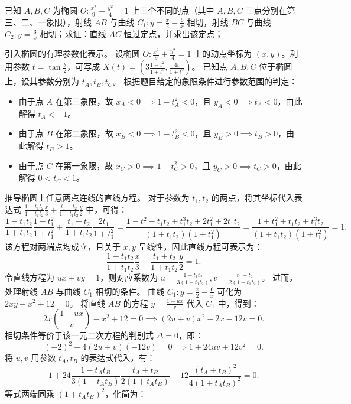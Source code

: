 \begin{example}
已知 \(A,B,C\) 为椭圆 \(O: \frac{x^2}{9} + \frac{y^2}{4} = 1\) 上三个不同的点（其中 \(A,B,C\) 三点分别在第三、二、一象限），射线 \(AB\) 与曲线 \(C_1: y = \frac{x}{2} - \frac{6}{x}\) 相切，射线 \(BC\) 与曲线 \(C_2: y = \frac{3}{x}\) 相切；求证：直线 \(AC\) 恒过定点，并求出该定点；
\end{example}
\begin{solution}
引入椭圆的有理参数化表示。
设椭圆 $O: \frac{x^2}{9} + \frac{y^2}{4} = 1$ 上的动点坐标为 $(x, y)$。利用参数 $t = \tan\frac{\theta}{2}$，可写成 $X(t) = \left( 3\frac{1-t^2}{1+t^2}, \frac{4t}{1+t^2} \right)$。
已知点 $A, B, C$ 位于椭圆上，设其参数分别为 $t_A, t_B, t_C$。
根据题目给定的象限条件进行参数范围的判定：
\begin{itemize}
\item 由于点 $A$ 在第三象限，故 $x_A < 0 \implies 1-t_A^2 < 0$，且 $y_A < 0 \implies t_A < 0$，由此解得 $t_A < -1$。
\item 由于点 $B$ 在第二象限，故 $x_B < 0 \implies 1-t_B^2 < 0$，且 $y_B > 0 \implies t_B > 0$，由此解得 $t_B > 1$。
\item 由于点 $C$ 在第一象限，故 $x_C > 0 \implies 1-t_C^2 > 0$，且 $y_C > 0 \implies t_C > 0$，由此解得 $0 < t_C < 1$。
\end{itemize}
推导椭圆上任意两点连线的直线方程。
对于参数为 $t_1, t_2$ 的两点，将其坐标代入表达式 $\frac{1-t_1t_2}{1+t_1t_2}\frac{x}{3} + \frac{t_1+t_2}{1+t_1t_2}\frac{y}{2}$ 中，可得：
\[
\frac{1-t_1t_2}{1+t_1t_2} \frac{1-t_1^2}{1+t_1^2} + \frac{t_1+t_2}{1+t_1t_2} \frac{2t_1}{1+t_1^2} = \frac{1 - t_1^2 - t_1t_2 + t_1^3 t_2 + 2t_1^2 + 2t_1t_2}{(1+t_1t_2)(1+t_1^2)} = \frac{1 + t_1^2 + t_1t_2 + t_1^3t_2}{(1+t_1t_2)(1+t_1^2)} = 1.
\]
该方程对两端点均成立，且关于 $x, y$ 呈线性，因此直线方程可表示为：
\[
\frac{1-t_1t_2}{1+t_1t_2}\frac{x}{3} + \frac{t_1+t_2}{1+t_1t_2}\frac{y}{2} = 1.
\]
令直线方程为 $ux + vy = 1$，则对应系数为 $u = \frac{1-t_1t_2}{3(1+t_1t_2)}, v = \frac{t_1+t_2}{2(1+t_1t_2)}$。
进而，处理射线 $AB$ 与曲线 $C_1$ 相切的条件。
曲线 $C_1: y = \frac{x}{2} - \frac{6}{x}$ 可化为 $2xy - x^2 + 12 = 0$。
将直线 $AB$ 的方程 $y = \frac{1-ux}{v}$ 代入 $C_1$ 中，得到：
\[
2x\left(\frac{1-ux}{v}\right) - x^2 + 12 = 0 \implies (2u+v)x^2 - 2x - 12v = 0.
\]
相切条件等价于该一元二次方程的判别式 $\Delta = 0$，即：
\[
(-2)^2 - 4(2u+v)(-12v) = 0 \implies 1 + 24uv + 12v^2 = 0.
\]
将 $u, v$ 用参数 $t_A, t_B$ 的表达式代入，有：
\[
1 + 24 \frac{1-t_At_B}{3(1+t_At_B)} \frac{t_A+t_B}{2(1+t_At_B)} + 12 \frac{(t_A+t_B)^2}{4(1+t_At_B)^2} = 0.
\]
等式两端同乘 $(1+t_At_B)^2$，化简为：

\end{solution}
